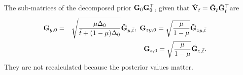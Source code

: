 The sub-matrices of the decomposed prior $\mathbf{G}_{0}\mathbf{G}_{0}^{\top}$, given that $\tilde{\mathbf{V}}_{\bar{t}} = \tilde{\mathbf{G}}_{\bar{t}}\tilde{\mathbf{G}}_{\bar{t}}^{\top}$are
\begin{eqnarray*}
\nonumber
\hspace*{-2.0ex}\mat{G}_{y,0} &=& \sqrt{\frac{\mu\Delta_{0}}{\bar{t} + (1-\mu)\Delta_{0}}}\tilde{\mat{G}}_{y,\bar{t}},\ \mat{G}_{zy,0} = \sqrt{\frac{\mu}{1-\mu}}\tilde{\mat{G}}_{zy,\bar{t}}\\
&&\hspace*{-4.0ex}\mat{G}_{z,0}=\sqrt{\frac{\mu}{1-\mu}}\tilde{\mat{G}}_{z,\bar{t}}.
\end{eqnarray*}
They are not recalculated because the posterior values matter. 